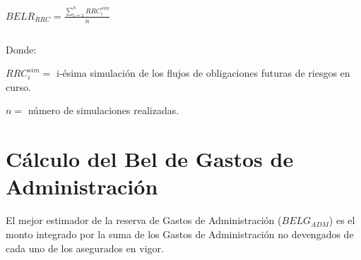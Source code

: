 \documentclass[11pt,twoside,openright,spanish]{report}
\numberwithin{equation}{chapter}
\numberwithin{figure}{chapter}
\numberwithin{table}{chapter}
\begin{document}
	 

$ $

 
	
		{\centering
		$BELR_{RRC}^{}=\frac{\sum _{i=1}^{n}RRC_{i}^{sim}}{n}$
		\noindent
			
	}
	
	 

$ $

 
	
	Donde:
	
	 
	
	$RRC_{i}^{sim}=$ i-ésima simulación de los flujos de obligaciones futuras de riesgos en curso.
	
	$n=$ número de simulaciones realizadas.
\begin{comment}	
	 
	Para Salud Individual Dental, el $BELR_{RRC}$ se calculará como el producto de la prima de tarifa no devengada y el factor de siniestralidad última de mercado proporcionado por la Comisión Nacional de Seguros y Fianzas:


	 

$ $

 
	
	
	{\centering
		$BELR_{RRC}^{}=PTND_{} \cdot FS_{BEL}^{RRC}$
		\noindent
		
	}
	
	 

$ $

 
	
	Donde:
	
	 
	
	$PTND_{}=$ Prima de tarifa no devengada.
\begin{comment}	
	$FS_{BEL}^{RRC}=$ Factor de Siniestralidad última con información de mercado.
	
	 

$ $

 

	El cálculo del $BELR_{RRC}$, se realizará de forma trimestral y se prorrateara con el vigor de la valuación del cierre de mes a fin de obtener la reserva de riesgos en curso.

\end{comment}
	
	 
	\section{Cálculo del Bel de Gastos de Administración}
	 
	El mejor estimador de la reserva de Gastos de Administración ($BELG_{ADM}$) es el monto integrado por la suma de los Gastos de Administración no devengados de cada uno de los asegurados en vigor.
	
\end{document}
